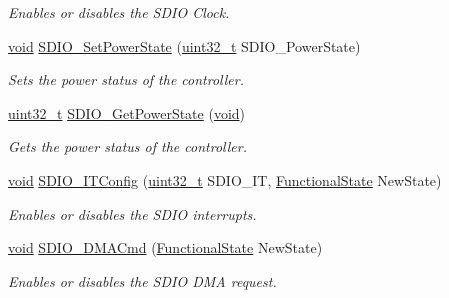 \begin{DoxyCompactItemize}
\begin{DoxyCompactList}\small\item\em Enables or disables the S\+D\+IO Clock. \end{DoxyCompactList}\item 
\hyperlink{usb__devapi_8h_afabf60e7f57651d6d595a02c75f07cd0}{void} \hyperlink{group___s_d_i_o___private___functions_ga36ecca32b904de74218fbe65cd5f5270}{S\+D\+I\+O\+\_\+\+Set\+Power\+State} (\hyperlink{_p_e___types_8h_a33594304e786b158f3fb30289278f5af}{uint32\+\_\+t} S\+D\+I\+O\+\_\+\+Power\+State)
\begin{DoxyCompactList}\small\item\em Sets the power status of the controller. \end{DoxyCompactList}\item 
\hyperlink{_p_e___types_8h_a33594304e786b158f3fb30289278f5af}{uint32\+\_\+t} \hyperlink{group___s_d_i_o___private___functions_ga3a19de2c7cd51645702213f64a1758ed}{S\+D\+I\+O\+\_\+\+Get\+Power\+State} (\hyperlink{usb__devapi_8h_afabf60e7f57651d6d595a02c75f07cd0}{void})
\begin{DoxyCompactList}\small\item\em Gets the power status of the controller. \end{DoxyCompactList}\item 
\hyperlink{usb__devapi_8h_afabf60e7f57651d6d595a02c75f07cd0}{void} \hyperlink{group___s_d_i_o___private___functions_ga208f51237ef43288735829dbaed37f00}{S\+D\+I\+O\+\_\+\+I\+T\+Config} (\hyperlink{_p_e___types_8h_a33594304e786b158f3fb30289278f5af}{uint32\+\_\+t} S\+D\+I\+O\+\_\+\+IT, \hyperlink{agilefox_2library_2inc_2stm32f10x__type_8h_ac9a7e9a35d2513ec15c3b537aaa4fba1}{Functional\+State} New\+State)
\begin{DoxyCompactList}\small\item\em Enables or disables the S\+D\+IO interrupts. \end{DoxyCompactList}\item 
\hyperlink{usb__devapi_8h_afabf60e7f57651d6d595a02c75f07cd0}{void} \hyperlink{group___s_d_i_o___private___functions_gad36fde5ec0ce0c2089b9d971c2271e6e}{S\+D\+I\+O\+\_\+\+D\+M\+A\+Cmd} (\hyperlink{agilefox_2library_2inc_2stm32f10x__type_8h_ac9a7e9a35d2513ec15c3b537aaa4fba1}{Functional\+State} New\+State)
\begin{DoxyCompactList}\small\item\em Enables or disables the S\+D\+IO D\+MA request. \end{DoxyCompactList}\item 

\end{DoxyCompactItemize}
